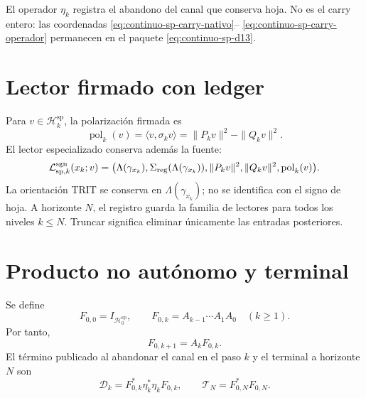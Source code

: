 El operador \(\eta_k\) registra el abandono del canal que conserva hoja. No
es el carry entero: las coordenadas
\eqref{eq:continuo-sp-carry-nativo}--
\eqref{eq:continuo-sp-carry-operador} permanecen en el paquete
\eqref{eq:continuo-sp-d13}.

\section{Lector firmado con ledger}

Para \(v\in\mathcal H_k^{\mathrm{sp}}\), la polarización firmada es
\begin{equation}
\label{eq:continuo-sp-polarizacion-firmada}
 \operatorname{pol}_k(v)
 =\langle v,\sigma_kv\rangle
 =\|P_kv\|^2-\|Q_kv\|^2.
\end{equation}
El lector especializado conserva además la fuente:
\begin{equation}
\label{eq:continuo-sp-lector-firmado}
 \mathcal L^{\rm sgn}_{\mathrm{sp},k}(x_k;v)
 =\bigl(
   \Lambda(\gamma_{x_k}),
   \Sigma_{\rm reg}(\Lambda(\gamma_{x_k})),
   \|P_kv\|^2,
   \|Q_kv\|^2,
   \operatorname{pol}_k(v)\bigr).
\end{equation}
La orientación TRIT se conserva en \(\Lambda(\gamma_{x_k})\); no se
identifica con el signo de hoja. A horizonte \(N\), el registro guarda la
familia de lectores para todos los niveles \(k\leq N\). Truncar significa
eliminar únicamente las entradas posteriores.

\section{Producto no autónomo y terminal}

Se define
\begin{equation}
\label{eq:continuo-sp-f-producto}
 F_{0,0}=I_{\mathcal H_0^{\mathrm{sp}}},
 \qquad
 F_{0,k}=A_{k-1}\cdots A_1A_0
 \quad(k\geq1).
\end{equation}
Por tanto,
\begin{equation}
\label{eq:continuo-sp-f-recursion}
 F_{0,k+1}=A_kF_{0,k}.
\end{equation}
El término publicado al abandonar el canal en el paso \(k\) y el terminal a
horizonte \(N\) son
\begin{equation}
\label{eq:continuo-sp-defecto-terminal}
 \mathcal D_k=F_{0,k}^*\eta_k^*\eta_kF_{0,k},
 \qquad
 \mathcal T_N=F_{0,N}^*F_{0,N}.
\end{equation}

